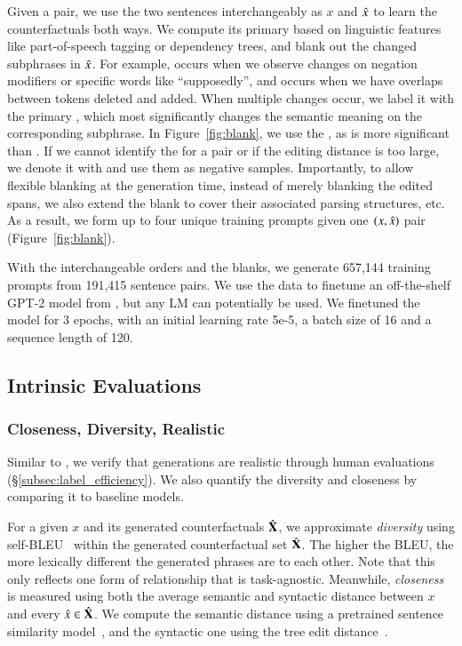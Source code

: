 Given a pair, we use the two sentences interchangeably as $x$ and $\hat{x}$ to learn the counterfactuals both ways.
We compute its primary \tagstr based on linguistic features like part-of-speech tagging or dependency trees, and blank out the changed subphrases in $\hat{x}$.
For example,  occurs when we observe changes on negation modifiers or specific words like ``supposedly'', and  occurs when we have overlaps between tokens deleted and added.
When multiple changes occur, we label it with the primary \tagstr, which most significantly changes the semantic meaning on the corresponding subphrase.
In Figure~\ref{fig:blank}, we use the \tagstrshort {}, as  is more significant than .
If we cannot identify the \tagstr for a pair or if the editing distance is too large, we denote it with  and use them as negative samples.
Importantly, to allow flexible blanking at the generation time, instead of merely blanking the edited spans, we also extend the blank to cover their associated parsing structures, etc.
As a result, we form up to four unique training prompts given one $(x, \hat{x})$ pair (Figure~\ref{fig:blank}).


With the interchangeable orders and the blanks, we generate 657,144 training prompts from 191,415 sentence pairs.
We use the data to finetune an off-the-shelf GPT-2 model from \citet{Wolf2019HuggingFacesTS}, but any LM can potentially be used.
We finetuned the model for 3 epochs, with an initial learning rate 5e-5, a batch size of 16 and a sequence length of 120.


\subsection{Intrinsic Evaluations}
\label{appendix:intrinsic}
\subsubsection{Closeness, Diversity, Realistic}

Similar to \citet{madaan2020generate}, we verify that \sysname generations are realistic through human evaluations (\S\ref{subsec:label_efficiency}).
We also quantify the diversity and closeness by comparing it to baseline models.

For a given $x$ and its generated counterfactuals $\hat{\mathbf{X}}$, we approximate \emph{diversity} using self-BLEU~\cite{malandrakis-etal-2019-controlled, zhu2018texygen} within the generated counterfactual set $\hat{\mathbf{X}}$.
The higher the BLEU, the more lexically different the generated phrases are to each other.
Note that this only reflects one form of \relation{\xp} relationship that is task-agnostic. 
Meanwhile, \emph{closeness} is measured using both the average semantic and syntactic distance between $x$ and every $\hat{x} \in \hat{\mathbf{X}}$.
We compute the semantic distance using a pretrained sentence similarity model~\cite{reimers-2019-sentence-bert}, and the syntactic one using the tree edit distance~\cite{zhang1989simple}.


